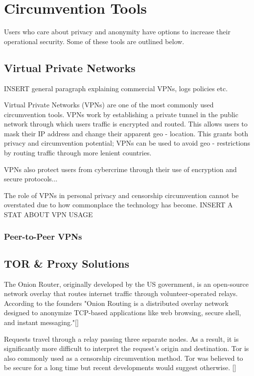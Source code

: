 \chapter{Circumvention Tools}

Users who care about privacy and anonymity have options to increase their operational security. Some of these tools are outlined below.

\section{Virtual Private Networks}

INSERT general paragraph explaining commercial VPNs, logs policies etc.

Virtual Private Networks (VPNs) are one of the most commonly used circumvention tools. VPNs work by establishing a private tunnel in the public network through which users traffic is encrypted and routed. This allows users to mask their IP address and change their apparent geo - location. This grants both privacy and circumvention potential; VPNs can be used to avoid geo - restrictions by routing traffic through more lenient countries. 

VPNs also protect users from cybercrime through their use of encryption and secure protocols...

The role of VPNs in personal privacy and censorship circumvention cannot be overstated due to how commonplace the technology has become. INSERT A STAT ABOUT VPN USAGE


\subsection{Peer-to-Peer VPNs}

\section{TOR \& Proxy Solutions}

The Onion Router, originally developed by the US government, is an open-source network overlay that routes internet traffic through volunteer-operated relays. According to the founders "Onion Routing is a distributed overlay network designed to anonymize TCP-based applications like web browsing, secure shell, and instant messaging."[]

Requests travel through a relay passing three separate nodes. As a result, it is significantly more difficult to interpret the request’s origin and destination. Tor is also commonly used as a censorship circumvention method. Tor was believed to be secure for a long time but recent developments would suggest otherwise. []



